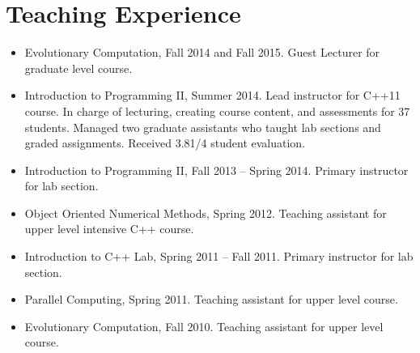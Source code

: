 \documentclass[a4paper,11pt]{article}
\begin{document}
\section{Teaching Experience}
\begin{itemize}
\item Evolutionary Computation, Fall 2014 and Fall 2015. Guest Lecturer for graduate level course.
\item Introduction to Programming II, Summer 2014.
      Lead instructor for C++11 course. In charge of lecturing, creating course content, and assessments
      for 37 students. Managed two graduate assistants who taught lab sections and graded assignments.
      Received 3.81/4 student evaluation.
\item Introduction to Programming II, Fall 2013 -- Spring 2014. Primary instructor for lab section.
\item Object Oriented Numerical Methods, Spring 2012. Teaching assistant for upper level intensive C++ course.
\item Introduction to C++ Lab, Spring 2011 -- Fall 2011. Primary instructor for lab section.
\item Parallel Computing, Spring 2011. Teaching assistant for upper level course.
\item Evolutionary Computation, Fall 2010. Teaching assistant for upper level course.
\end{itemize}

\begin{publications}

\end{publications}
\end{document}
